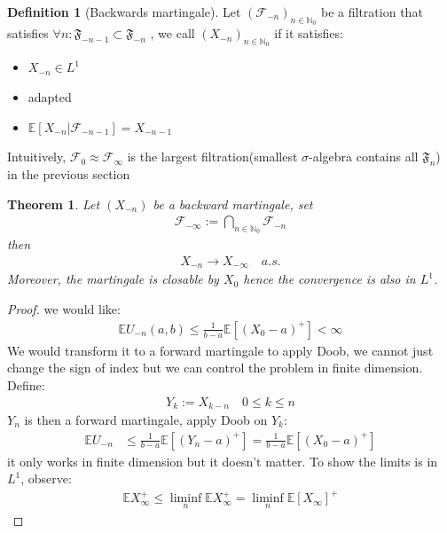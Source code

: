 \documentclass[a4paper,11pt]{book}
\newtheorem{theorem}{Theorem}[section]
\theoremstyle{definition}
\newtheorem{definition}{Definition}[section]
\theoremstyle{remark}
\begin{document}
\begin{definition}[Backwards martingale]
	Let $(\mathcal{F}_{-n})_{n \in \mathbb{N}_0}$ be a filtration that satisfies $\forall n: \mathfrak{F}_{-n-1} \subset \mathfrak{F}_{-n}$ , we call $(X_{-n})_{n \in \mathbb{N}_0}$ if it satisfies:
	\begin{itemize}
		\item $X_{-n} \in L^1$
		\item adapted
		\item $\mathbb{E}[X_{-n} | \mathcal{F}_{-n -1}] = X_{-n-1}$
	\end{itemize}
	Intuitively, $\mathcal{F}_0 \approx \mathcal{F}_{\infty}$ is the largest filtration(smallest $\sigma$-algebra contains all $\mathfrak{F}_n$) in the previous section
\end{definition}

\begin{theorem}
	Let $(X_{-n})$ be a backward martingale, set\label{Q:why a filtration } 
	\begin{align*}
		\mathcal{F}_{-\infty} := \bigcap_{n \in \mathbb{N}_0} \mathcal{F}_{-n}
	\end{align*}
	then 
	\begin{align*}
		X_{-n} \rightarrow X_{-\infty} \quad a.s.
	\end{align*}
	Moreover, the martingale is closable by $X_0$ hence the convergence is also in $L^1$.
\end{theorem}
\begin{proof}
we would like:
\begin{align*}
	\mathbb{E}U_{-n}(a, b) \leq \frac{1}{b-a} \mathbb{E}[(X_0-a)^+] < \infty
\end{align*}	
We would transform it to a forward martingale to apply Doob, we cannot just change the sign of index but we can control the problem in finite dimension.
Define:
\begin{align*}
	Y_k:= X_{k-n} \quad 0 \le k \le n
\end{align*}
$Y_n$ is then a forward martingale, apply Doob on $Y_k$:
\begin{align*}
	\mathbb{E}U_{-n} &\le \frac{1}{b-a} \mathbb{E}[(Y_n - a)^+]
	= \frac{1}{b-a} \mathbb{E}[(X_0 - a)^+]
\end{align*}
it only works in finite dimension but it doesn't matter. To show the limits is in $L^1$, observe:
\begin{align*}
	\mathbb{E}X_\infty^+ \le \liminf_n \mathbb{E}X_\infty^+ 
	= \liminf_n \mathbb{E}[X_\infty]^+
\end{align*}
\end{proof}
\end{document}

